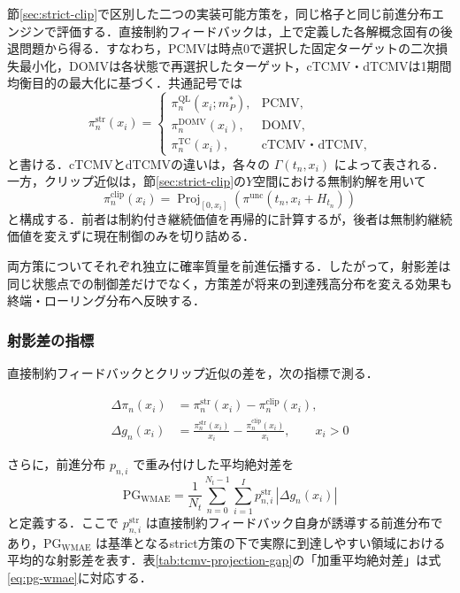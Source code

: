\documentclass[10pt,a4paper]{article}
\theoremstyle{plain}
\theoremstyle{definition}
\DeclareMathOperator{\Proj}{Proj}
\begin{document}
節\ref{sec:strict-clip}で区別した二つの実装可能方策を，同じ格子と同じ前進分布エンジンで評価する．直接制約フィードバックは，上で定義した各解概念固有の後退問題から得る．すなわち，PCMVは時点0で選択した固定ターゲットの二次損失最小化，DOMVは各状態で再選択したターゲット，cTCMV・dTCMVは1期間均衡目的の最大化に基づく．共通記号では
\begin{equation}
  \pi_n^{\mathrm{str}}(x_i)
  =
  \begin{cases}
    \pi_n^{\mathrm{QL}}(x_i;m_P^*), & \text{PCMV},\\
    \pi_n^{\mathrm{DOMV}}(x_i), & \text{DOMV},\\
    \pi_n^{\mathrm{TC}}(x_i), & \text{cTCMV・dTCMV},
  \end{cases}
  \label{eq:pi-str-def}
\end{equation}
と書ける．cTCMVとdTCMVの違いは，各々の $\Gamma(t_n,x_i)$ によって表される．一方，クリップ近似は，節\ref{sec:strict-clip}の$Y$空間における無制約解を用いて
\begin{equation}
  \pi_n^{\mathrm{clip}}(x_i)
  =\Proj_{[0,x_i]}\!\left(\pi^{\mathrm{unc}}(t_n,x_i+H_{t_n})\right)
  \label{eq:pi-clip-def}
\end{equation}
と構成する．前者は制約付き継続価値を再帰的に計算するが，後者は無制約継続価値を変えずに現在制御のみを切り詰める．

両方策についてそれぞれ独立に確率質量を前進伝播する．したがって，射影差は同じ状態点での制御差だけでなく，方策差が将来の到達残高分布を変える効果も終端・ローリング分布へ反映する．

\subsubsection{射影差の指標}

直接制約フィードバックとクリップ近似の差を，次の指標で測る．

\begin{align}
  \Delta\pi_n(x_i)
  &=\pi_n^{\mathrm{str}}(x_i)-\pi_n^{\mathrm{clip}}(x_i),
  \label{eq:delta-pi}\\
  \Delta g_n(x_i)
  &=\frac{\pi_n^{\mathrm{str}}(x_i)}{x_i}
  -\frac{\pi_n^{\mathrm{clip}}(x_i)}{x_i},
  \qquad x_i>0
  \label{eq:delta-g}
\end{align}

さらに，前進分布 $p_{n,i}$ で重み付けした平均絶対差を
\begin{equation}
  \mathrm{PG}_{\mathrm{WMAE}}
  =\frac{1}{N_t}
  \sum_{n=0}^{N_t-1}\sum_{i=1}^{I}
  p_{n,i}^{\mathrm{str}}\,|\Delta g_n(x_i)|
  \label{eq:pg-wmae}
\end{equation}
と定義する．ここで $p_{n,i}^{\mathrm{str}}$ は直接制約フィードバック自身が誘導する前進分布であり，$\mathrm{PG}_{\mathrm{WMAE}}$ は基準となるstrict方策の下で実際に到達しやすい領域における平均的な射影差を表す．表\ref{tab:tcmv-projection-gap}の「加重平均絶対差」は式\eqref{eq:pg-wmae}に対応する．
\end{document}

